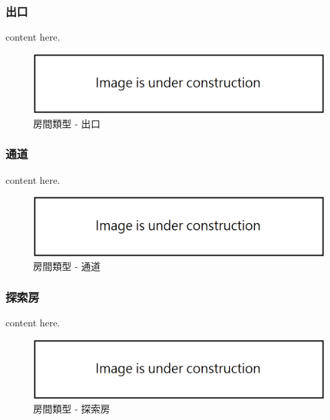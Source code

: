 \subsubsection{出口}
\label{sssec:method-spacepieces-types-reward}

content here.

\begin{figure}[h]
  \begin{center}
    \includegraphics[width=1.0\textwidth]{figures/under_construction.png}
    \caption{房間類型 - 出口}
    \label{fig:roomtype-reward}
  \end{center}
\end{figure}

\subsubsection{通道}
\label{sssec:method-spacepieces-types-path}

content here.

\begin{figure}[h]
  \begin{center}
    \includegraphics[width=1.0\textwidth]{figures/under_construction.png}
    \caption{房間類型 - 通道}
    \label{fig:roomtype-path}
  \end{center}
\end{figure}

\subsubsection{探索房}
\label{sssec:method-spacepieces-types-exploration}

content here.

\begin{figure}[h]
  \begin{center}
    \includegraphics[width=1.0\textwidth]{figures/under_construction.png}
    \caption{房間類型 - 探索房}
    \label{fig:roomtype-exploration}
  \end{center}
\end{figure}

